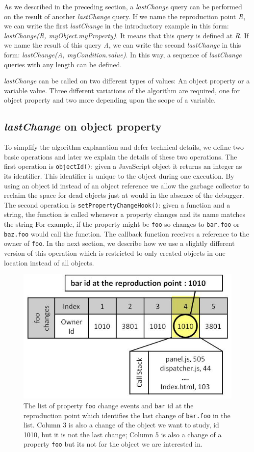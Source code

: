 \documentclass[preprint]{sigplanconf}
\begin{document}
As we described in the preceding section, a \textit{lastChange} query can
be performed on the result of another \textit{lastChange} query. If we
name the reproduction point \textit{R}, we can write the first
\textit{lastChange} in the introductory example in this form:
\textit{lastChange(R, myObject.myProperty)}. It means that this query
is defined at \textit{R}. If we name the result of this query
\textit{A}, we can write the second \textit{lastChange} in this form:
\textit{lastChange(A, myCondition.value)}. In this way, a sequence of
\textit{lastChange} queries with any length can be defined.

\textit{lastChange} can be called on two different types of values: An
object property or a variable value. Three different variations of the
algorithm are required, one for object property and two more depending
upon the scope of a variable.

\subsection{\textit{lastChange} on object property}
To simplify the algorithm explanation and defer technical details, we
define two basic operations and later we explain the details of these
two operations. The first operation is \texttt{objectId()}: given a
JavaScript object it returns an integer as its identifier. This
identifier is unique to the object during one execution.  By using an
object id instead of an object reference we allow the garbage
collector to reclaim the space for dead objects just at would in the
absence of the debugger. The second
operation is \texttt{setPropertyChangeHook()}: given a function and a
string, the function is called whenever a property changes and its
name matches the string For example, if the property might be
\texttt{foo} so changes to \texttt{bar.foo} or \texttt{baz.foo} would
call the function.  The callback function receives a reference to the
owner of \texttt{foo}. In the next section, we describe how we use
a slightly different version of this operation which is restricted 
to only created objects in one location instead of all objects.

\begin{figure}[htp]
\includegraphics[width=.48\textwidth]{6-foo-changes1.jpg}
\caption{The list of property \texttt{foo} change events and
  \texttt{bar} id at the reproduction point which identifies the last
  change of \texttt{bar.foo} in the list. Column 3 is also a change of
  the object we want to study, id 1010, but it is not the last change;
  Column 5 is also a change of a property \texttt{foo} but its not for
  the object we are interested in.}
\label{fig:foo-changes1}
\end{figure}
\end{document}

